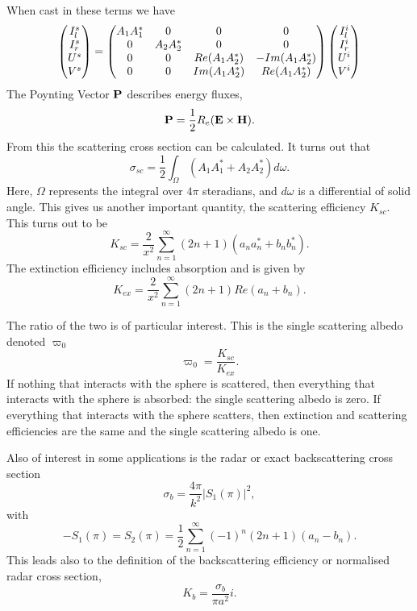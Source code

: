 \documentclass[12pt]{article}
\begin{document}
When cast in these terms we have
\begin{equation}
\begin{pmatrix} I^s_l \cr I^s_r \cr U^s \cr V^s 
\end{pmatrix}
= \begin{pmatrix}
    A_1 A^*_1 & 0 & 0 & 0 \cr
    0 & A_2 A^*_2 & 0 & 0 \cr
    0 & 0 & Re(A_1 A^*_2) & -Im( A_1 A^*_2) \cr
    0 & 0 & Im(A_1 A^*_2) & Re( A_1 A^*_2) 
\end{pmatrix}
\begin{pmatrix} I^i_l \cr I^i_r \cr U^i \cr V^i \end{pmatrix}
\end{equation}
The Poynting Vector ${\bf P}$ describes energy fluxes, 
\begin{equation}
 {\bf P}=\frac{1}{2} R_e( {\bf E} \times {\bf H}).
\end{equation}
From this the scattering cross section can be calculated.  It turns out that
\begin{equation}
\sigma_{sc}=\frac{1}{2} \int_\Omega (A_1 A^*_1 + A_2 A^*_2) d \omega.
\end{equation}
Here, $\Omega$ represents the integral over $4 \pi$ steradians, and $d \omega$ is a differential of solid angle. This gives us another important quantity, the scattering efficiency $K_{sc}$. This turns out to be
\begin{equation}
K_{sc}=\frac{2}{x^2} \sum_{n=1}^\infty (2n+1)(a_n a^*_n +b_n b^*_n).
\end{equation}
The extinction efficiency includes absorption and is given by
\begin{equation}
K_{ex}=\frac{2}{x^2} \sum_{n=1}^\infty (2n+1) Re(a_n+b_n).
\end{equation}

The ratio of the two is of particular interest. This is the single
scattering albedo denoted $\varpi_0$
\begin{equation}
\varpi_0=\frac{K_{sc}}{K_{ex}}.
\end{equation}
If nothing that interacts with the sphere is scattered, then everything 
that interacts with the sphere is absorbed: the single scattering albedo is zero. If everything that interacts with the sphere scatters, then extinction and scattering efficiencies are the same and the single scattering albedo is one.


Also of interest in some applications is the radar or exact backscattering cross section
\begin{equation}
\sigma_b=\frac{ 4 \pi}{k^2} \vert S_1(\pi) \vert^2,
\end{equation}
with
\begin{equation}
-S_1(\pi)=S_2(\pi)=\frac{1}{2}\sum_{n=1}^\infty (-1)^n (2n+1) (a_n-b_n).
\end{equation} 
This leads also to the definition of the backscattering efficiency or normalised radar cross section,
\begin{equation}
K_b=\frac{ \sigma_b}{\pi a^2}i.
\end{equation}
\end{document}
